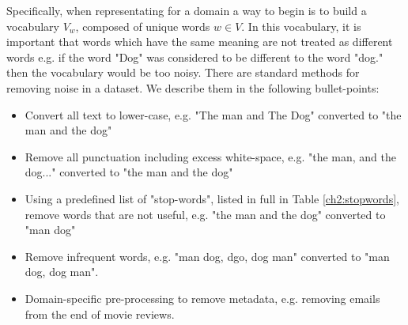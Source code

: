 
Specifically, when representating for a domain a way to begin is to build a  vocabulary $V_w$, composed of unique words $w \in V$. In this vocabulary, it is important that words which have the same meaning are not treated as different words e.g. if the word "Dog" was considered to be different to the word "dog." then the vocabulary would be too noisy. There are standard methods for removing noise in a dataset. We describe them in the following bullet-points: %

\begin{itemize}
	\item  Convert all text to lower-case, e.g. "The man and The Dog" converted to "the man and the dog"
	\item  Remove all punctuation including excess white-space, e.g. "the man, and the dog..." converted to "the man and the dog"
	\item Using a predefined list of "stop-words", listed in full in Table \ref{ch2:stopwords}, remove words that are not useful, e.g. "the man and the dog" converted to "man dog"
	\item Remove infrequent words, e.g. "man dog, dgo, dog man" converted to "man dog, dog man".
	\item Domain-specific pre-processing to remove metadata, e.g. removing emails from the end of movie reviews.
\end{itemize}










